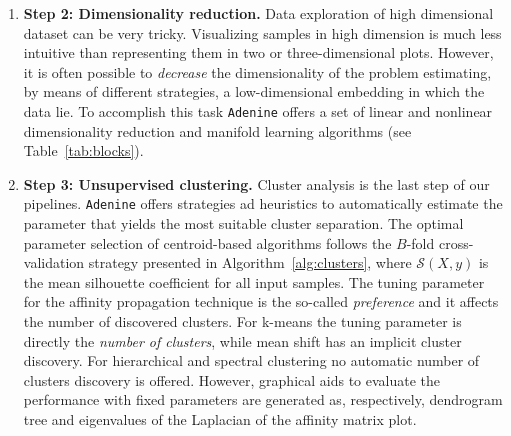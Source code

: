 \documentclass[twoside,11pt]{article}
\makeatletter
\newcommand{\ade}{\texttt{Adenine}\@\xspace}
\makeatother
\begin{document}
\begin{enumerate}[leftmargin=*]
  \item[]{\bf Step 2: Dimensionality reduction.}
  Data exploration of high dimensional dataset can be very tricky. Visualizing samples in high dimension is much less intuitive than representing them in two or three-dimensional plots. However, it is often possible to \emph{decrease} the dimensionality of the problem estimating, by means of different strategies, a low-dimensional embedding in which the data lie. To accomplish this task \ade offers a set of linear and nonlinear dimensionality reduction and manifold learning algorithms (see Table~\ref{tab:blocks}).

  \item[]{\bf Step 3: Unsupervised clustering.}
  Cluster analysis is the last step of our pipelines. 
  \ade offers strategies ad heuristics to automatically estimate the parameter that yields the most suitable cluster separation. The optimal parameter selection of centroid-based algorithms follows the $B$-fold cross-validation strategy presented in Algorithm~\ref{alg:clusters}, where $\mathcal{S}(X,y)$ is the mean silhouette coefficient \citep{rousseeuw1987silhouettes} for all input samples.
  The tuning parameter for the affinity propagation technique \citep{frey2007clustering} is the so-called \emph{preference} and it affects the number of discovered clusters. For k-means \citep{bishop2006pattern} the tuning parameter is directly the \emph{number of clusters}, while mean shift \citep{comaniciu2002mean} has an implicit cluster discovery. For hierarchical \citep{friedman2001elements} and spectral clustering \citep{shi2000normalized} no automatic number of clusters discovery is offered. However, graphical aids to evaluate the performance with fixed parameters are generated as, respectively, dendrogram tree and eigenvalues of the Laplacian of the affinity matrix plot.
 

\end{enumerate}
\end{document}
